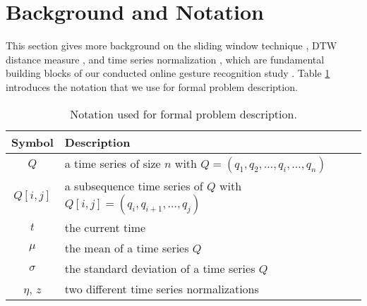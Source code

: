 \section{Background and Notation} \label{background_and_notation}

This section gives more background on the sliding window technique \cite{keogh2004sliding}, DTW distance measure \cite{keogh2002exact}, and time series normalization \cite{das1998rule}, which are fundamental building blocks of our conducted online gesture recognition study \cite{lesti2017filter}. Table \ref{tab:notation} introduces the notation that we use for formal problem description.

\begin{table}
    \begin{center}
        \begin{tabularx}{\textwidth}{c X}
            \hline
            \textbf{Symbol} \qquad & \textbf{Description}\\
            \hline
            $Q$ & a time series of size $n$ with $Q = (q_1, q_2, \dots, q_i, \dots, q_n)$\\
            $Q[i,j]$ & a subsequence time series of $Q$ with $Q[i,j] = (q_i, q_{i+1}, \dots, q_{j})$\\
            $t$ & the current time\\
            $\mu$ & the mean of a time series $Q$\\
            $\sigma$ & the standard deviation of a time series $Q$\\
            $\eta$, $z$  & two different time series normalizations\\
            \hline
        \end{tabularx}
    \end{center}
    \caption{Notation used for formal problem description.}
	\label{tab:notation}
\end{table}



